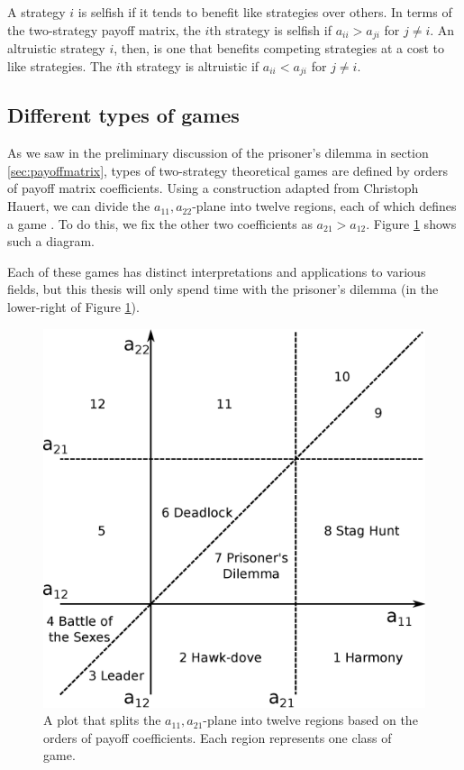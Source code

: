 \documentclass[notitlepage,reqno]{amsart}
\begin{document}
A strategy $i$ is selfish if it tends to
benefit like strategies over others. In terms of the
two-strategy payoff matrix, the $i$th strategy is selfish if $a_{ii}
> a_{ji}$ for $j\neq i$. An altruistic strategy $i$, then, is one
that benefits competing strategies at a cost to like strategies. The $i$th
strategy is altruistic if $a_{ii} < a_{ji}$ for
$j\neq i$.

\subsection{Different types of games}

As we saw in the preliminary discussion of the prisoner's dilemma
in section \ref{sec:payoffmatrix}, types of two-strategy theoretical games are
defined by orders of payoff matrix coefficients. Using a construction
adapted from Christoph Hauert, we can divide the
$a_{11},a_{22}$-plane into twelve regions, each of which defines a
game \cite{hauert}. To do this, we fix the other two coefficients as
$a_{21} > a_{12}$. Figure \ref{fig:gametypesdiagram} shows such a
diagram.

Each of these games has distinct interpretations and applications to
various fields, but this thesis will only spend time with the
prisoner's dilemma (in the lower-right of Figure \ref{fig:gametypesdiagram}).

\begin{figure}[h]
\includegraphics[width=.7\textwidth]{./images/types_of_games_plot.eps}
\caption{
A plot that splits the $a_{11},a_{21}$-plane into twelve regions
based on the orders of payoff coefficients. Each region represents one
class of game.
}
\label{fig:gametypesdiagram}
\end{figure}
\end{document}
